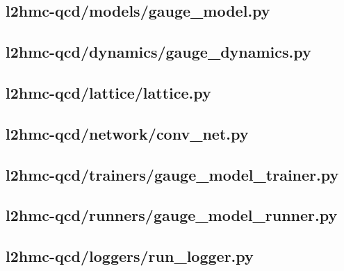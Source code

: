 \clearpage
\subsection{l2hmc-qcd/models/gauge\_model.py}


\clearpage
\subsection{l2hmc-qcd/dynamics/gauge\_dynamics.py}


\clearpage
\subsection{l2hmc-qcd/lattice/lattice.py}


\clearpage
\subsection{l2hmc-qcd/network/conv\_net.py}


\clearpage
\subsection{l2hmc-qcd/trainers/gauge\_model\_trainer.py}


\clearpage
\subsection{l2hmc-qcd/runners/gauge\_model\_runner.py}


\clearpage
\subsection{l2hmc-qcd/loggers/run\_logger.py}


